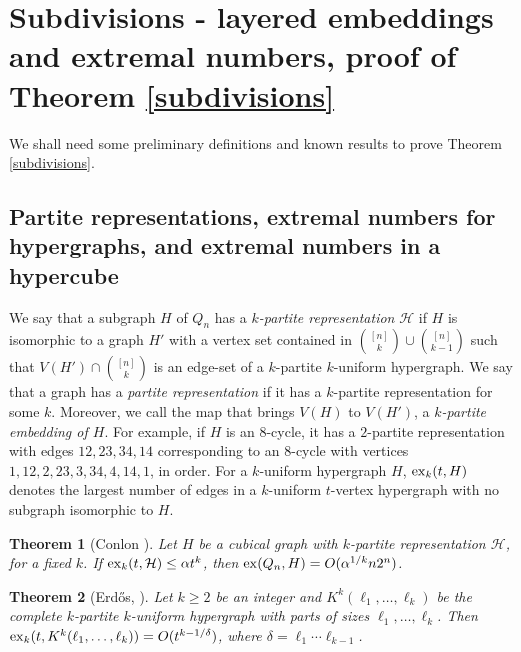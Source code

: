 \documentclass[11pt, a4paper]{article}
\newtheorem{theorem}{Theorem}
\newcommand{\cH}{\mathcal{H}}
\newcommand{\ex}{{\rm  ex}}
\begin{document}
\section{Subdivisions - layered embeddings and extremal numbers, proof of Theorem \ref{subdivisions}}\label{sec:subdivisions}

We shall need some preliminary definitions and known results to prove Theorem \ref{subdivisions}.
\subsection{Partite representations, extremal numbers for hypergraphs,  and extremal numbers in a hypercube}


	
	We say that a subgraph $H$ of $Q_n$ has  a {\it $k$-partite representation}  $\cH$  if $H$ is isomorphic to a graph $H'$ with a vertex set contained in  $\binom{[n]}{k}\cup \binom{[n]}{k-1}$ such that   $V(H') \cap \binom{[n]}{k}$ is an edge-set of a $k$-partite $k$-uniform hypergraph.  We say that a graph has a {\it partite representation} if it has a $k$-partite representation for some $k$.
	Moreover, we call the map that brings $V(H)$ to  $V(H')$, a {\it $k$-partite embedding of $H$}.
	For example, if $H$ is an $8$-cycle, it has a $2$-partite representation with edges 
$12, 23, 34, 14$ corresponding to an $8$-cycle  with vertices $1, 12, 2, 23, 3, 34, 4, 14, 1$, in order. 
For a $k$-uniform hypergraph $H$, $\ex_k(t, H)$ denotes the largest number of edges in a $k$-uniform $t$-vertex hypergraph with no subgraph isomorphic to $H$.




\begin{theorem} [Conlon \cite{C}]\label{Conlon-rep-exponent}
Let $H$ be a cubical graph with $k$-partite representation $\cH$, for a fixed $k$.  If $\ex_k(t, \cH) \leq \alpha t^k$, then $\ex(Q_n, H) = O(\alpha^{1/k}n2^n)$. 
\end{theorem}


\begin{theorem}[Erd\H{o}s, \cite{E64}] \label{Erdos}
Let $k\geq 2$ be an integer and $K^{k}(\ell_1, \ldots, \ell_k)$ be the complete $k$-partite $k$-uniform hypergraph with parts of sizes $\ell_1, \ldots, \ell_k$.
Then $\ex_{k}(t, K^{k}(\ell_1, \ldots, \ell_{k})) = O(t^{k - 1/\delta})$, 
where  $\delta = \ell_1 \cdots \ell_{k-1}$. 
\end{theorem}
\end{document}
